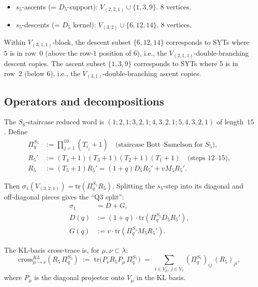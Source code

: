 \documentclass[11pt]{article}
\theoremstyle{definition}
\begin{document}
\begin{itemize}[leftmargin=2em,topsep=0.2em,itemsep=0.1em]
\item $s_5$-ascents (= $D_5$-support): $V_{(2,2,1)} \cup \{1, 3, 9\}$. $8$ vertices.
\item $s_5$-descents (= $D_5$ kernel): $V_{(3,2)} \cup \{6, 12, 14\}$. $8$ vertices.
\end{itemize}

Within $V_{(3,1,1)}$-block, the descent subset $\{6, 12, 14\}$ corresponds to SYTs
where $5$ is in row~$0$ (above the row-$1$ position of $6$), i.e., the
$V_{(2,1,1)}$-double-branching descent copies. The ascent subset $\{1, 3, 9\}$
corresponds to SYTs where $5$ is in row~$2$ (below $6$), i.e., the
$V_{(3,1)}$-double-branching ascent copies.

\subsection*{Operators and decompositions}

The $S_6$-staircase reduced word is $(1; 2,1; 3,2,1; 4,3,2,1; 5,4,3,2,1)$ of length~$15$. Define
\begin{align*}
\Pi_q^{S_5} &:= \prod_{j=1}^{10}(T_{i_j}+1) \quad \text{(staircase Bott--Samelson for } S_5\text{)},\\
R_5' &:= (T_4+1)(T_3+1)(T_2+1)(T_1+1) \quad \text{(steps 12--15)},\\
R_5 &:= (T_5+1) R_5' = (1+q) D_5 R_5' + v M_5 R_5'.
\end{align*}

Then $\sigma_1(V_{(3,2,1)}) = \mathrm{tr}(\Pi_q^{S_5} R_5)$. Splitting the
$s_5$-step into its diagonal and off-diagonal pieces gives the
``Q3 split'':
\begin{align*}
\sigma_1 &= D + G,\\
D(q) &:= (1+q) \cdot \mathrm{tr}(\Pi_q^{S_5} D_5 R_5'),\\
G(q) &:= v \cdot \mathrm{tr}(\Pi_q^{S_5} M_5 R_5').
\end{align*}

The KL-basis cross-trace is, for $\mu, \nu \subset \lambda$:
\[
\mathrm{cross}_{\mu \to \nu}^{KL}(R_5\,\Pi_q^{S_5}) \;:=\; \mathrm{tr}\bigl(P_\nu R_5 P_\mu\, \Pi_q^{S_5}\bigr) \;=\; \sum_{i \in V_\mu,\, j \in V_\nu} (\Pi_q^{S_5})_{ij}\,(R_5)_{ji},
\]
where $P_\mu$ is the diagonal projector onto $V_\mu$ in the KL basis.
\end{document}
